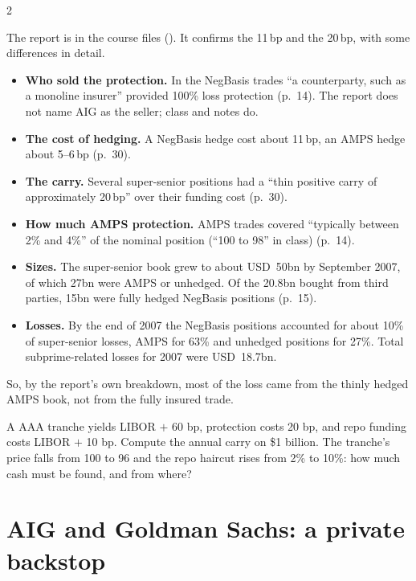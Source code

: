 \begin{paracol}{2}
\begin{coursenote}
The report is in the course files (). It confirms the 11\,bp and the 20\,bp, with some differences in detail.
\begin{itemize}
  \item \textbf{Who sold the protection.} In the NegBasis trades ``a counterparty, such as a monoline insurer'' provided 100\% loss protection (p.~14). The report does not name AIG as the seller; class and notes do.
  \item \textbf{The cost of hedging.} A NegBasis hedge cost about 11\,bp, an AMPS hedge about 5--6\,bp (p.~30).
  \item \textbf{The carry.} Several super-senior positions had a ``thin positive carry of approximately 20\,bp'' over their funding cost (p.~30).
  \item \textbf{How much AMPS protection.} AMPS trades covered ``typically between 2\% and 4\%'' of the nominal position (``100 to 98'' in class) (p.~14).
  \item \textbf{Sizes.} The super-senior book grew to about USD~50bn by September 2007, of which 27bn were AMPS or unhedged. Of the 20.8bn bought from third parties, 15bn were fully hedged NegBasis positions (p.~15).
  \item \textbf{Losses.} By the end of 2007 the NegBasis positions accounted for about 10\% of super-senior losses, AMPS for 63\% and unhedged positions for 27\%. Total subprime-related losses for 2007 were USD~18.7bn.
\end{itemize}
So, by the report's own breakdown, most of the loss came from the thinly hedged AMPS book, not from the fully insured trade.
\end{coursenote}

\begin{exercise}
A AAA tranche yields LIBOR $+$ 60 bp, protection costs 20 bp, and repo funding costs LIBOR $+$ 10 bp. Compute the annual carry on \$1 billion. The tranche's price falls
from 100 to 96 and the repo haircut rises from 2\% to 10\%: how much cash must be found, and from where?
\end{exercise}

\section{AIG and Goldman Sachs: a private backstop}\label{sec:cds-aig}


\end{paracol}
